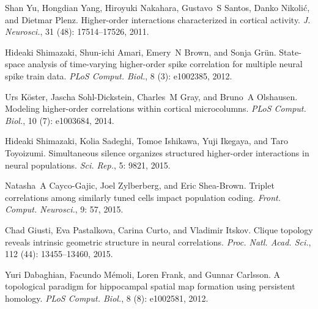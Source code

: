 Shan Yu, Hongdian Yang, Hiroyuki Nakahara, Gustavo~S Santos, Danko Nikoli{\'c},
and Dietmar Plenz.
\newblock Higher-order interactions characterized in cortical activity.
\newblock \emph{J. Neurosci.}, 31 (48): 17514--17526, 2011.

Hideaki Shimazaki, Shun-ichi Amari, Emery~N Brown, and Sonja Gr{\"u}n.
\newblock State-space analysis of time-varying higher-order spike correlation
for multiple neural spike train data.
\newblock \emph{PLoS Comput. Biol.}, 8 (3): e1002385, 2012.

Urs K{\"o}ster, Jascha {Sohl-Dickstein}, Charles~M Gray, and Bruno~A Olshausen.
\newblock Modeling higher-order correlations within cortical microcolumns.
\newblock \emph{PLoS Comput. Biol.}, 10 (7): e1003684, 2014.

Hideaki Shimazaki, Kolia Sadeghi, Tomoe Ishikawa, Yuji Ikegaya, and Taro
Toyoizumi.
\newblock Simultaneous silence organizes structured higher-order interactions
in neural populations.
\newblock \emph{Sci. Rep.}, 5: 9821, 2015.

Natasha~A {Cayco-Gajic}, Joel Zylberberg, and Eric {Shea-Brown}.
\newblock Triplet correlations among similarly tuned cells impact population
coding.
\newblock \emph{Front. Comput. Neurosci.}, 9: 57, 2015.

Chad Giusti, Eva Pastalkova, Carina Curto, and Vladimir Itskov.
\newblock Clique topology reveals intrinsic geometric structure in neural
correlations.
\newblock \emph{Proc. Natl. Acad. Sci.}, 112 (44):
13455--13460, 2015.

Yuri Dabaghian, Facundo M{\'e}moli, Loren Frank, and Gunnar Carlsson.
\newblock A topological paradigm for hippocampal spatial map formation using
persistent homology.
\newblock \emph{PLoS Comput. Biol.}, 8 (8): e1002581, 2012.

